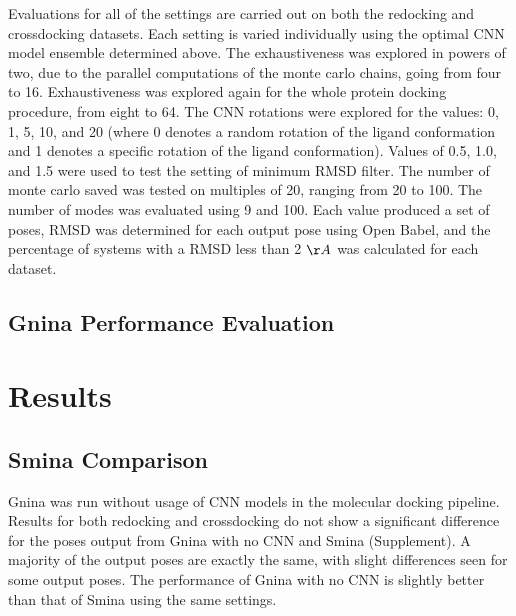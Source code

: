 \documentclass[journal=jcisd8,manuscript=article]{achemso}
\begin{document}
Evaluations for all of the settings are carried out on both the redocking and crossdocking datasets. Each setting is varied individually using the optimal CNN model ensemble determined above. The exhaustiveness was explored in powers of two, due to the parallel computations of the monte carlo chains, going from four to 16. Exhaustiveness was explored again for the whole protein docking procedure, from eight to 64. The CNN rotations were explored for the values: 0, 1, 5, 10, and 20 (where 0 denotes a random rotation of the ligand conformation and 1 denotes a specific rotation of the ligand conformation). Values of 0.5, 1.0, and 1.5 were used to test the setting of minimum RMSD filter. The number of monte carlo saved was tested on multiples of 20, ranging from 20 to 100. The number of modes was evaluated using 9 and 100. Each value produced a set of poses, RMSD was determined for each output pose using Open Babel, and the percentage of systems with a RMSD less than 2 $\AA$ was calculated for each dataset.

\subsection{Gnina Performance Evaluation}

\section{Results}
\subsection{Smina Comparison}
Gnina was run without usage of CNN models in the molecular docking pipeline. Results for both redocking and crossdocking do not show a significant difference for the poses output from Gnina with no CNN and Smina (Supplement). A majority of the output poses are exactly the same, with slight differences seen for some output poses. The performance of Gnina with no CNN is slightly better than that of Smina using the same settings.
\end{document}
